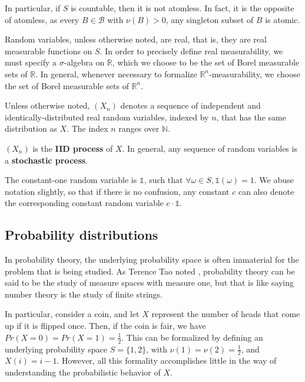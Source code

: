 \begin{remark}
	In particular, if $S$ is countable, then it is not atomless. In fact, it is the opposite of atomless, as every \(B \in \mathcal{B}\) with \( \nu(B) > 0\), any singleton subset of $B$ is atomic.
\end{remark}

\begin{conv}
Random variables, unless otherwise noted, are real, that is, they are real measurable functions on \(S\). In order to precisely define real measurability, we must specify a $\sigma$-algebra on $\mathbb{R}$, which we choose to be the set of Borel measurable sets of $\mathbb{R}$. In general, whenever necessary to formalize $\mathbb{R}^n$-measurability, we choose the set of Borel measurable sets of $\mathbb{R}^n$.
\end{conv}

\begin{conv}
Unless otherwise noted, $(X_n)$ denotes a sequence of independent and identically-distributed real random variables, indexed by $n$, that has the same distribution as $X$. The index $n$ ranges over $\mathbb{N}$.
\end{conv}

\begin{defn}
$(X_n)$ is the \textbf{IID process} of $X$. In general, any sequence of random variables is a \textbf{stochastic process}.
\end{defn}

\begin{notn}
The constant-one random variable is \(\mathds{1}\), such that \(\forall \omega\in S, \mathds{1}(\omega) = 1\). We abuse notation slightly, so that if there is no confusion, any constant $c$ can also denote the corresponding constant random variable $c\cdot \mathds{1}$.
\end{notn}

\subsection{Probability distributions}
\label{sec:prob_dist}
In probability theory, the underlying probability space is often immaterial for the problem that is being studied. As Terence Tao noted \cite{tao254ARandomMatrices2010}, probability theory can be said to be the study of measure spaces with measure one, but that is like saying number theory is the study of finite strings.

In particular, consider a coin, and let $X$ represent the number of heads that come up if it is flipped once. Then, if the coin is fair, we have $Pr(X = 0) = Pr(X=1) = \frac 1 2$. This can be formalized by defining an underlying probability space $S = \{1, 2\}$, with $\nu(1) = \nu(2) = \frac 1 2$, and $X(i) = i-1$. However, all this formality accomplishes little in the way of understanding the probabilistic behavior of $X$.

